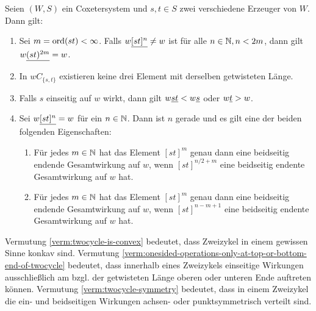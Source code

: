 \begin{verm}
Seien $(W,S)$ ein Coxetersystem und $s,t \in S$ zwei verschiedene Erzeuger
von $W$. Dann gilt:
\begin{enumerate}
  \item \label{verm:max-twocycle-length} Sei $m = \operatorname{ord} (st) < \infty$. Falls
  $w \underline{[st]^n} \neq w$ ist für alle $n \in \mathbb{N}, n < 2m$, dann gilt $w \underline{(st)^{2m}} = w$.
  \item \label{verm:twocycle-is-convex} In $wC_{\{s,t\}}$ existieren keine drei
  Element mit derselben getwisteten Länge.
  \item \label{verm:onesided-operations-only-at-top-or-bottom-end-of-twocycle}
  Falls $s$ einseitig auf $w$ wirkt, dann gilt $w \underline{st} < w \underline{s}$ oder $w
  \underline{t} > w$.
  \item \label{verm:twocycle-symmetry} Sei $w \underline{[st]^n} = w$ für ein $n \in
  \mathbb{N}$. Dann ist $n$ gerade und es gilt eine der beiden folgenden Eigenschaften:
  	\begin{enumerate}
  	  \item Für jedes $m \in \mathbb{N}$ hat das Element $[st]^m$ genau dann eine
  	  beidseitig endende Gesamtwirkung auf $w$, wenn $[st]^{n/2+m}$ eine beidseitig endente
  	  Gesamtwirkung auf $w$ hat.
  	  \item Für jedes $m \in \mathbb{N}$ hat das Element $[st]^m$ genau dann eine
  	  beidseitig endende Gesamtwirkung auf $w$, wenn $[st]^{n-m+1}$ eine beidseitig endente
  	  Gesamtwirkung auf $w$ hat.
  	\end{enumerate}
\end{enumerate}
\end{verm}

\begin{anm}
	Vermutung \ref{verm:twocycle-is-convex} bedeutet, dass Zweizykel in einem
	gewissen Sinne konkav sind. Vermutung
	\ref{verm:onesided-operations-only-at-top-or-bottom-end-of-twocycle} bedeutet,
	dass innerhalb eines Zweizykels einseitige Wirkungen ausschließlich am
	bzgl. der getwisteten Länge oberen oder unteren Ende auftreten können.
	Vermutung \ref{verm:twocycle-symmetry} bedeutet, dass in einem Zweizykel die
	ein- und beidseitigen Wirkungen achsen- oder punktsymmetrisch verteilt sind.
\end{anm}